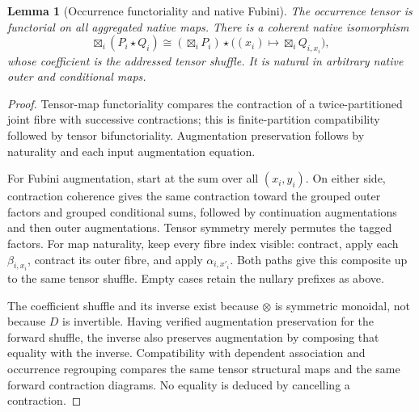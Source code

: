 \documentclass[11pt]{article}
\newtheorem{lemma}[theorem]{Lemma}
\begin{document}
\begin{lemma}[Occurrence functoriality and native Fubini]
The occurrence tensor is functorial on all aggregated native maps. There is a coherent native isomorphism
\[
 \boxtimes_i(P_i\star Q_i)\cong
 (\boxtimes_iP_i)\star\bigl((x_i)\mapsto\boxtimes_iQ_{i,x_i}\bigr),
\]
whose coefficient is the addressed tensor shuffle. It is natural in arbitrary native outer and conditional maps.
\end{lemma}
\begin{proof}
Tensor-map functoriality compares the contraction of a twice-partitioned joint fibre with successive contractions; this is finite-partition compatibility followed by tensor bifunctoriality. Augmentation preservation follows by naturality and each input augmentation equation.

For Fubini augmentation, start at the sum over all $(x_i,y_i)$. On either side, contraction coherence gives the same contraction toward the grouped outer factors and grouped conditional sums, followed by continuation augmentations and then outer augmentations. Tensor symmetry merely permutes the tagged factors. For map naturality, keep every fibre index visible: contract, apply each $\beta_{i,x_i}$, contract its outer fibre, and apply $\alpha_{i,x'_i}$. Both paths give this composite up to the same tensor shuffle. Empty cases retain the nullary prefixes as above.

The coefficient shuffle and its inverse exist because $\otimes$ is symmetric monoidal, not because $D$ is invertible. Having verified augmentation preservation for the forward shuffle, the inverse also preserves augmentation by composing that equality with the inverse. Compatibility with dependent association and occurrence regrouping compares the same tensor structural maps and the same forward contraction diagrams. No equality is deduced by cancelling a contraction.
\end{proof}
\end{document}
